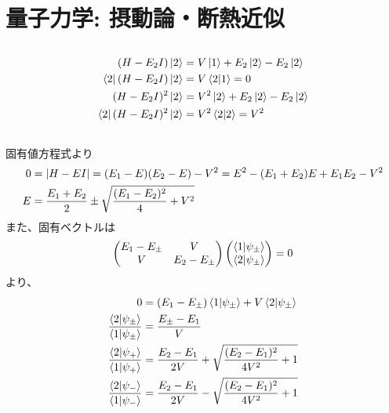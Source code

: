 \documentclass[../../sp_2017.tex]{subfiles}
\begin{document}
\setcounter{section}{0}
\section{量子力学: 摂動論・断熱近似}
\subsection{}
\begin{equation}\begin{aligned}[b]
    (H-E_2I)\ket{2}&=V\ket{1}+E_2\ket{2}-E_2\ket{2}\\
    \bra{2}(H-E_2I)\ket{2} &= V \braket{2}{1}=0\\
    (H-E_2I)^2\ket{2}&=V^2\ket{2}+E_2\ket{2}-E_2\ket{2}\\
    \bra{2}(H-E_2I)^2\ket{2} &= V^2 \braket{2}{2}=V^2
\end{aligned}\end{equation}
\subsection{}
固有値方程式より
\begin{equation}\begin{aligned}[b]
    0 &= \abs{H-EI} = (E_1-E)(E_2-E)-V^2 = E^2-(E_1+E_2)E+E_1E_2-V^2\\
    E &= \frac{E_1+E_2}{2}\pm\sqrt{\frac{(E_1-E_2)^2}{4}+V^2}
\end{aligned}\end{equation}
また、固有ベクトルは
\begin{equation}\begin{aligned}[b]
    \begin{pmatrix}
        E_1-E_{\pm} & V\\
        V & E_2-E_{\pm}
    \end{pmatrix}\begin{pmatrix}
        \braket{1}{\psi_\pm}\\
        \braket{2}{\psi_\pm}
    \end{pmatrix}=0
\end{aligned}\end{equation}
より、
\begin{equation}\begin{aligned}[b]
    0&=(E_1-E_\pm)\braket{1}{\psi_\pm} + V\braket{2}{\psi_\pm}\\
    \frac{\braket{2}{\psi_\pm}}{\braket{1}{\psi_\pm}} &= \frac{E_\pm-E_1}{V}\\
    \frac{\braket{2}{\psi_+}}{\braket{1}{\psi_+}} &= \frac{E_2-E_1}{2V}+\sqrt{\frac{(E_2-E_1)^2}{4V^2}+1}\\
    \frac{\braket{2}{\psi_-}}{\braket{1}{\psi_-}} &= \frac{E_2-E_1}{2V}-\sqrt{\frac{(E_2-E_1)^2}{4V^2}+1}
\end{aligned}\end{equation}
\end{document}
